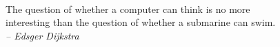 \begin{titlepage}
	~\\ \vfill \noindent 
	The question of whether a computer can think is no more \\
	interesting than the question of whether a submarine can swim. \\
	\textit{-- Edsger Dijkstra}
\end{titlepage}

